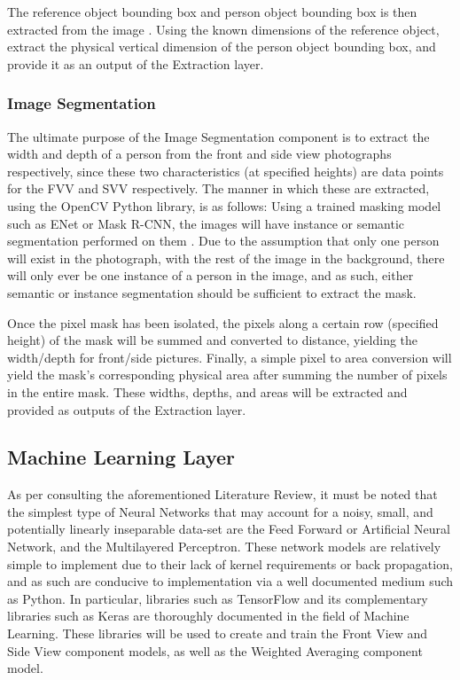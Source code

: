 The reference object bounding box and person object bounding box is then extracted from the image \cite{objectDetection}.
Using the known dimensions of the reference object, extract the physical vertical dimension of the person object bounding box, and provide it as an output of the Extraction layer.
\subsubsection{Image Segmentation}
The ultimate purpose of the Image Segmentation component is to extract the width and depth of a person from the front and side view photographs respectively, since these two characteristics (at specified heights) are data points for the FVV and SVV respectively.
The manner in which these are extracted, using the OpenCV Python library, is as follows:
Using a trained masking model such as ENet or Mask R-CNN, the images will have instance or semantic segmentation performed on them \cite{semantic, instance}.
Due to the assumption that only one person will exist in the photograph, with the rest of the image in the background, there will only ever be one instance of a person in the image, and as such, either semantic or instance segmentation should be sufficient to extract the mask.

Once the pixel mask has been isolated, the pixels along a certain row (specified height) of the mask will be summed and converted to distance, yielding the width/depth for front/side pictures.
Finally, a simple pixel to area conversion will yield the mask's corresponding physical area after summing the number of pixels in the entire mask.
These widths, depths, and areas will be extracted and provided as outputs of the Extraction layer.
\subsection{Machine Learning Layer}
As per consulting the aforementioned Literature Review, it must be noted that the simplest type of Neural Networks that may account for a noisy, small, and potentially linearly inseparable data-set are the Feed Forward or Artificial Neural Network, and the Multilayered Perceptron.
These network models are relatively simple to implement due to their lack of kernel requirements or back propagation, and as such are conducive to implementation via a well documented medium such as Python.
In particular, libraries such as TensorFlow and its complementary libraries such as Keras are thoroughly documented in the field of Machine Learning.
These libraries will be used to create and train the Front View and Side View component models, as well as the Weighted Averaging component model.

